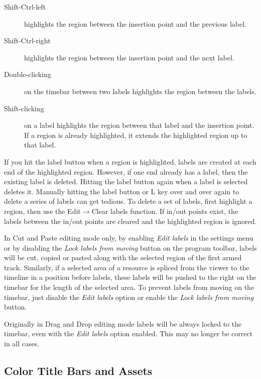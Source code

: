 \begin{description}
    \item[Shift-Ctrl-left] highlights the region between the insertion point and the previous label.
    \item[Shift-Ctrl-right] highlights the region between the insertion point and the next label.
    \item[Double-clicking] on the timebar between two labels highlights the region between the labels.	   
    \item[Shift-clicking] on a label highlights the region between that label and the insertion point.
        If a region is already highlighted, it extends the highlighted region up to that label.
\end{description}


If you hit the label button when a region is highlighted, labels are created at each end of the highlighted region. 
However, if one end already has a label, then the existing label is deleted. 
Hitting the label button again when a label is selected deletes it. 
Manually hitting the label button or L key over and over again to delete a series of labels can get tedious. 
To delete a set of labels, first highlight a region, then use the Edit$\rightarrow$Clear labels function. 
If in/out points exist, the labels between the in/out points are cleared and the highlighted region is ignored.


In Cut and Paste editing mode only, by enabling \emph{Edit labels} in the settings menu or by disabling the \emph{Lock labels from moving} button on the program toolbar, labels will be cut, copied or pasted along with the selected region of the first armed track. 
Similarly, if a selected area of a resource is spliced from the viewer to the timeline in a position before labels, these labels will be pushed to the right on the timebar for the length of the selected area. 
To prevent labels from moving on the timebar, just disable the \emph{Edit labels} option or enable the \emph{Lock labels from moving} button.


Originally in Drag and Drop editing mode labels will be always locked to the timebar, even with the \emph{Edit labels} option enabled.  
This may no longer be correct in all cases. 

\subsection{Color Title Bars and Assets}%
\label{sub:color_title_bars_and_assets}


